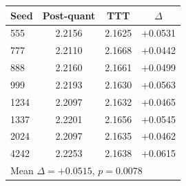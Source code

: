 \begin{tabular}{l c c c}
\toprule
Seed & Post-quant & TTT & $\Delta$ \\
\midrule
555 & 2.2156 & 2.1625 & +0.0531 \\
777 & 2.2110 & 2.1668 & +0.0442 \\
888 & 2.2160 & 2.1661 & +0.0499 \\
999 & 2.2193 & 2.1630 & +0.0563 \\
1234 & 2.2097 & 2.1632 & +0.0465 \\
1337 & 2.2201 & 2.1656 & +0.0545 \\
2024 & 2.2097 & 2.1635 & +0.0462 \\
4242 & 2.2253 & 2.1638 & +0.0615 \\
\midrule
\multicolumn{4}{l}{Mean $\Delta=+0.0515$, $p=0.0078$} \\
\bottomrule
\end{tabular}
